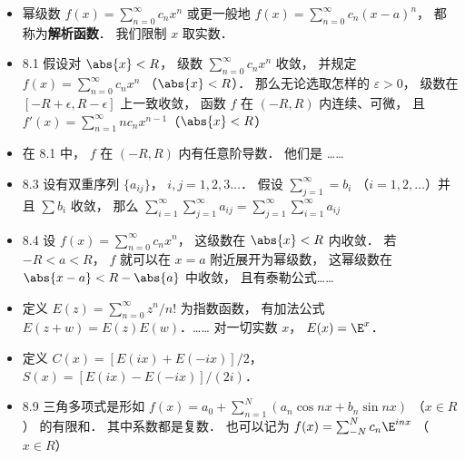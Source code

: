 \begin{itemize}
\item 幂级数 $f(x) = \sum_{n=0}^\infty c_n x^n$ 或更一般地 $f(x) = \sum_{n=0}^\infty c_n (x-a)^n$， 都称为\textbf{解析函数}． 我们限制 $x$ 取实数．

\item 8.1 假设对 $\abs{x}<R$， 级数 $\sum_{n=0}^\infty c_n x^n$ 收敛， 并规定 $f(x) = \sum_{n=0}^\infty c_n x^n$ （$\abs{x}<R$）． 那么无论选取怎样的 $\varepsilon >0$， 级数在 $[-R+\epsilon, R-\epsilon]$ 上一致收敛， 函数 $f$ 在 $(-R,R)$ 内连续、可微， 且 $f'(x)=\sum_{n=1}^\infty nc_n x^{n-1}$（$\abs{x}<R$）

\item 在 8.1 中， $f$ 在 $(-R,R)$ 内有任意阶导数． 他们是 ……

\item 8.3 设有双重序列 $\{a_{ij}\}$， $i,j=1,2,3\dots$． 假设 $\sum_{j=1}^\infty = b_i$ （$i=1,2,\dots$）并且 $\sum b_i$ 收敛， 那么 $\sum_{i=1}^\infty\sum_{j=1}^\infty a_{ij} = \sum_{j=1}^\infty\sum_{i=1}^\infty a_{ij}$

\item 8.4 设 $f(x)=\sum_{n=0}^\infty c_nx^n$， 这级数在 $\abs{x}<R$ 内收敛． 若 $-R<a<R$， $f$ 就可以在 $x=a$ 附近展开为幂级数， 这幂级数在 $\abs{x-a}<R-\abs{a}$ 中收敛， 且有泰勒公式……

\item 定义 $E(z) = \sum_{n=0}^\infty z^n/n!$ 为指数函数， 有加法公式 $E(z+w)=E(z)E(w)$．……  对一切实数 $x$， $E(x)=\E^x$．

\item 定义 $C(x) = [E(ix)+E(-ix)]/2$， $S(x)=[E(ix)-E(-ix)]/(2i)$．

\item 8.9 三角多项式是形如 $f(x) = a_0 + \sum_{n=1}^N (a_n\cos nx + b_n \sin nx)$ （$x\in R$） 的有限和． 其中系数都是复数． 也可以记为 $f(x) = \sum_{-N}^N c_n \E^{inx}$ （$x\in R$）
\end{itemize}

